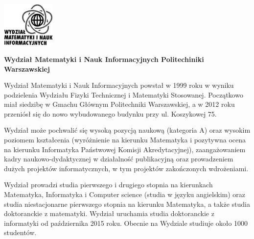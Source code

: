 \documentclass[\main/boa.tex]{subfiles}
\begin{document}
	\begin{minipage}[t]{0.915\textwidth}
		\center     
		\includegraphics[width=100px]{img/logos.bw/mini.png} 
	\end{minipage}

\Large \textbf {Wydział Matematyki i Nauk Informacyjnych Politechiniki Warszawskiej}


\vskip 0.3cm
\normalsize 

Wydział Matematyki i Nauk Informacyjnych powstał w 1999 roku w wyniku podzielenia Wydziału Fizyki Technicznej i Matematyki Stosowanej. Początkowo miał siedzibę w Gmachu Głównym Politechniki Warszawskiej, a w 2012 roku przeniósł się do nowo wybudowanego budynku przy ul. Koszykowej 75.

Wydział może pochwalić się wysoką pozycją naukową (kategoria A) oraz wysokim poziomem kształcenia (wyróżnienie na kierunku Matematyka i pozytywna ocena na kierunku Informatyka Państwowej Komisji Akredytacyjnej), zaangażowaniem kadry naukowo-dydaktycznej w działalność publikacyjną oraz prowadzeniem dużych projektów informatycznych, w tym projektów zakończonych wdrożeniami.

Wydział prowadzi studia pierwszego i drugiego stopnia na kierunkach Matematyka, Informatyka i Computer science (studia w języku angielskim) oraz studia niestacjonarne pierwszego stopnia na kierunku Matematyka, a także studia doktoranckie z matematyki. Wydział uruchamia studia doktoranckie z informatyki od października 2015 roku. Obecnie na Wydziale studiuje około 1000 studentów.
\end{document}

